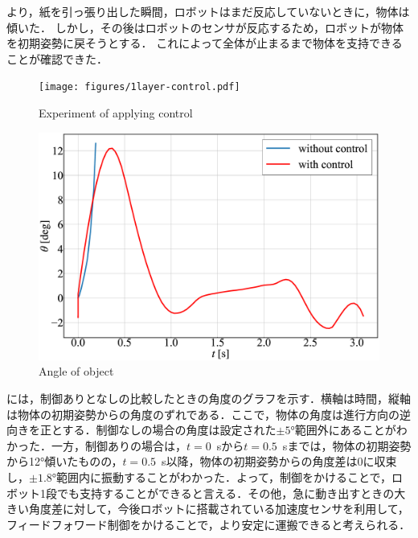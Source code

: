より，紙を引っ張り出した瞬間，ロボットはまだ反応していないときに，物体は傾いた．
しかし，その後はロボットのセンサが反応するため，ロボットが物体を初期姿勢に戻そうとする．
これによって全体が止まるまで物体を支持できることが確認できた．
\begin{figure}[tb]
  \centering
  \texttt{[image: figures/1layer-control.pdf]}
  \caption{Experiment of applying control}
  \label{fig:control}
\end{figure}
\begin{figure}[tb]
  \centering
  \includegraphics[width=0.7\columnwidth]{figures/angle-control.eps}
  \caption{Angle of object}
  \label{fig:angle}
\end{figure}
には，制御ありとなしの比較したときの角度のグラフを示す．横軸は時間，縦軸は物体の初期姿勢からの角度のずれである．ここで，物体の角度は進行方向の逆向きを正とする．制御なしの場合の角度は設定された$\pm5$\si{\degree}範囲外にあることがわかった．一方，制御ありの場合は，$t=0$~sから$t=0.5$~sまでは，物体の初期姿勢から12\si{\degree}傾いたものの，$t=0.5$~s以降，物体の初期姿勢からの角度差は0に収束し，$\pm1.8$\si{\degree}範囲内に振動することがわかった．よって，制御をかけることで，ロボット1段でも支持することができると言える．その他，急に動き出すときの大きい角度差に対して，今後ロボットに搭載されている加速度センサを利用して，フィードフォワード制御をかけることで，より安定に運搬できると考えられる．